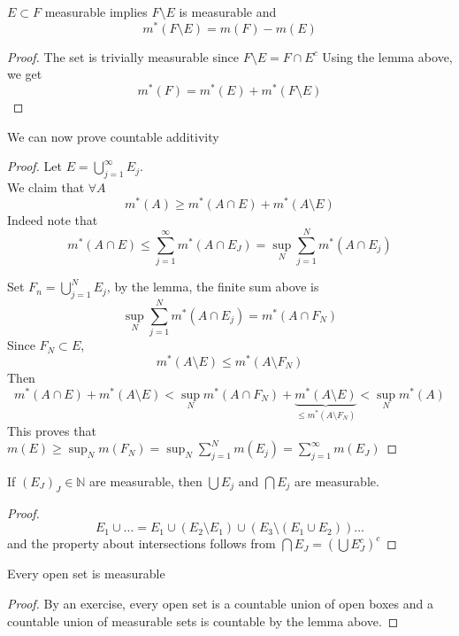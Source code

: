 \documentclass[../main.tex]{subfiles}
\begin{document}
\begin{crly}
$E \subset F$ measurable implies $F\setminus E$ is measurable and
\[ 
m^{*}( F\setminus E) = m( F) -m( E) 
\]

\end{crly}
\begin{proof}
The set is trivially measurable since $F\setminus E = F\cap E^{c}$ 	
Using the lemma above, we get
\[ 
m^{*}( F) = m^{*}( E) +m^{*}( F\setminus E) 
\]

\end{proof}
We can now prove countable additivity
\begin{proof}
Let $E= \bigcup_{j=1} ^{ \infty } E_j$.\\
We claim that $\forall A$ 
\[ 
m^{*}( A) \geq m^{*}( A\cap E) + m^{*}( A\setminus E) 
\]
Indeed note that
\[ 
m^{*}( A\cap E) \leq \sum_{j=1}^{ \infty }m^{*}( A\cap E_J) = \sup_N \sum_{j=1}^{ N} m^{*}( A\cap E_j) 		
\]

Set $F_n = \bigcup_{j=1}^{N}E_j$, by the lemma, the finite sum above is 
\[ 
\sup_N \sum_{j=1}^{ N} m^{*}( A\cap E_j) =m^{*}( A\cap F_N) 
\]
Since $F_N \subset E$,
\[ 
m^{*}( A\setminus E) \leq m^{*}( A\setminus F_N) 
\]
Then
\[ 
m^{*}( A\cap E) +m^{*}( A\setminus E) < \sup_N m^{*}( A\cap F_N) + \underbrace{m^{*}( A\setminus E)}_{ \leq m^{*}( A\setminus F_N) }< \sup_N m^{*}( A) 	
\]
This proves that $m( E) \geq \sup_N m( F_N) = \sup_N \sum_{j=1}^{ N}m( E_j) = \sum_{j=1}^{ \infty }m( E_J) $ 

\end{proof}
\begin{lemma}
If $( E_J )_J\in \mathbb{N}$ are measurable, then $\bigcup E_j$ and $\bigcap E_j$ are measurable.
\end{lemma}
\begin{proof}
\[ 
E_1\cup \ldots  = E_1 \cup ( E_2\setminus E_1) \cup ( E_3\setminus ( E_1\cup E_2) ) \ldots
\]
and the property about intersections follows from $\bigcap E_J = ( \bigcup E_J^{c})^{c}$
\end{proof}
\begin{lemma}
Every open set is measurable 
\end{lemma}
\begin{proof}
By an exercise, every open set is a countable union of open boxes and a countable union of measurable sets is countable by the lemma above.
\end{proof}
\end{document}
